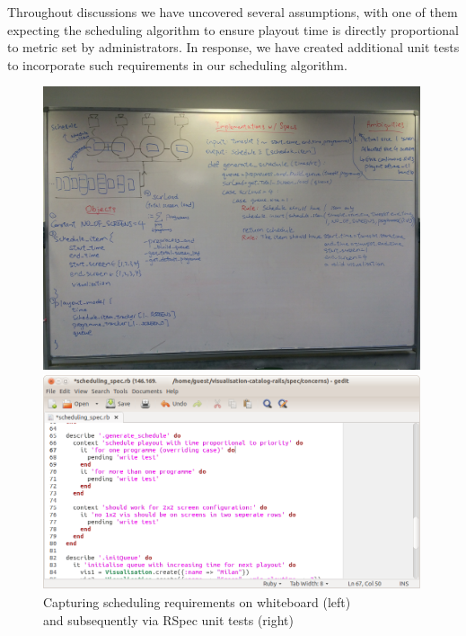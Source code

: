 \documentclass[a4paper]{article}
\begin{document}
Throughout discussions we have uncovered several assumptions, with one of them
expecting the scheduling algorithm to ensure playout time is 
directly proportional to metric set by administrators. In response,
we have created additional unit tests to incorporate such requirements 
in our scheduling algorithm.

\begin{figure}[H]
  \begin{minipage}{0.46\textwidth}
      \includegraphics[width = 0.99\textwidth, trim = 0 4.5cm 0 7cm, clip]{./evaluation/scheduling_whiteboard.jpg}
  \end{minipage}
  \begin{minipage}{0.53\textwidth}
      \includegraphics[width = 0.99\textwidth]{./evaluation/scheduling_spec.png}
  \end{minipage}
  \caption{Capturing scheduling requirements on whiteboard (left)\\ and subsequently via RSpec unit tests (right)}
 
\end{figure}
\end{document}
